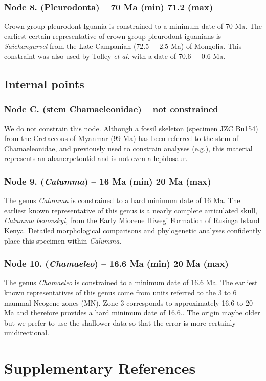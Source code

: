 \documentclass[a4paper, 12pt]{article}
\begin{document}
\subsubsection*{Node 8. (Pleurodonta) – 70 Ma (min) 71.2 (max)}
Crown-group pleurodont Iguania is constrained to a minimum date of 70 Ma. The earliest certain representative of crown-group pleurodont iguanians is \textit{Saichangurvel}\cite{conrad2007complete} from the Late Campanian (72.5 $\pm$ 2.5 Ma) of Mongolia. This constraint was also used by Tolley \textit{et al.}\cite{tolley2013large} with a date of 70.6 $\pm$ 0.6 Ma.
 
\subsection{Internal points}
\subsubsection*{Node C. (stem Chamaeleonidae) – not constrained}
We do not constrain this node. Although a fossil skeleton (specimen JZC Bu154) from the Cretaceous of Myanmar (99 Ma) has been referred to the stem of Chamaeleonidae\cite{daza2016mid}, and previously used to constrain analyses (e.g.\cite{skawinski2017evolution}), this material represents an abanerpetontid and is not even a lepidosaur\cite{daza2020enigmatic}.
 
\subsubsection*{Node 9. (\textit{Calumma}) – 16 Ma (min) 20 Ma (max)}
The genus \textit{Calumma} is constrained to a hard minimum date of 16 Ma. The earliest known representative of this genus is a nearly complete articulated skull, \textit{Calumma benovskyi}, from the Early Miocene Hiwegi Formation of Rusinga Island Kenya\cite{vcervnansky2020only}. Detailed morphological comparisons and phylogenetic analyses confidently place this specimen within \textit{Calumma}\cite{vcervnansky2020only}.
 
\subsubsection*{Node 10. (\textit{Chamaeleo}) – 16.6 Ma (min) 20 Ma (max)}
The genus \textit{Chamaeleo} is constrained to a minimum date of 16.6 Ma. The earliest known representatives of this genus come from units referred to the 3 to 6 mammal Neogene zones (MN)\cite{vcervnansky2010revision,bolet2013fossil}. Zone 3 corresponds to approximately 16.6 to 20 Ma and therefore provides a hard minimum date of 16.6.\cite{van2011biostratigraphy}. The origin maybe older but we prefer to use the shallower data so that the error is more certainly unidirectional.

\newpage
\section{Supplementary References}
 


\end{document}
